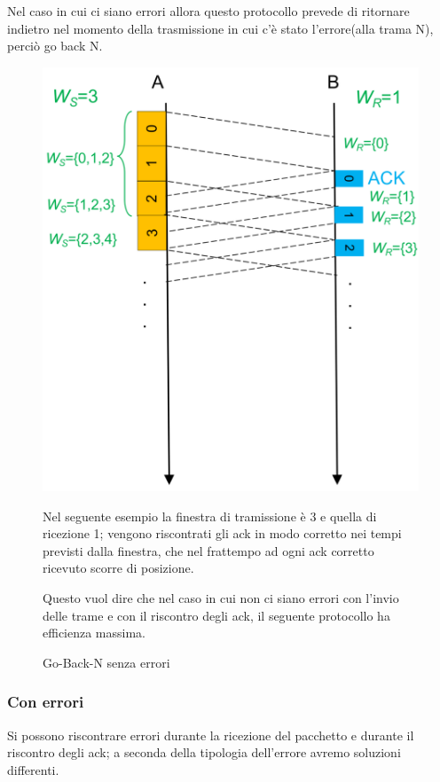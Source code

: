 Nel caso in cui ci siano errori allora questo protocollo prevede di ritornare indietro nel momento della trasmissione in cui c'è stato l'errore(alla trama N), perciò go back N.
\begin{figure}[htbp]
    \centering
    \begin{minipage}{0.4\textwidth}
        \includegraphics[width=\linewidth]{images/gobackinsenzaerrori.png}
        \caption{Go-Back-N senza errori}
    \end{minipage}%
    \hfill
    \begin{minipage}{0.55\textwidth}
        Nel seguente esempio la finestra di tramissione è 3 e quella di ricezione 1; vengono riscontrati gli ack in modo corretto nei tempi previsti dalla finestra, che nel frattempo ad ogni ack corretto ricevuto scorre di posizione.
        
        Questo vuol dire che nel caso in cui non ci siano errori con l'invio delle trame e con il riscontro degli ack, il seguente protocollo ha efficienza massima.
 
    \end{minipage}
\end{figure}
 \newpage
\subsubsection{Con errori}
Si possono riscontrare errori durante la ricezione del pacchetto e durante il riscontro degli ack; a seconda della tipologia dell'errore avremo soluzioni differenti.
